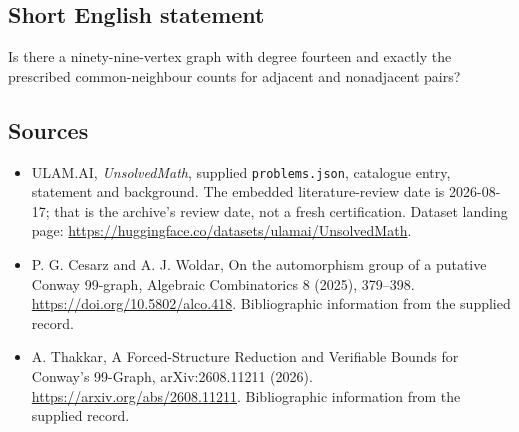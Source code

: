 \documentclass[11pt,a4paper]{article}
\begin{document}
\subsection{Short English statement}

Is there a ninety-nine-vertex graph with degree fourteen and exactly the prescribed common-neighbour counts for adjacent and nonadjacent pairs?

\subsection{Sources}

{\small

\begin{itemize}

\item[\hypertarget{source:statement:1}{S1}] ULAM.AI, \emph{UnsolvedMath}, supplied \texttt{problems.json}, catalogue entry, statement and background. The embedded literature-review date is 2026-08-17; that is the archive’s review date, not a fresh certification. Dataset landing page: \url{https://huggingface.co/datasets/ulamai/UnsolvedMath}.

\item[\hypertarget{source:statement:2}{S2}] P. G. Cesarz and A. J. Woldar, On the automorphism group of a putative Conway 99-graph, Algebraic Combinatorics 8 (2025), 379–398. \url{https://doi.org/10.5802/alco.418}. Bibliographic information from the supplied record.

\item[\hypertarget{source:statement:3}{S3}] A. Thakkar, A Forced-Structure Reduction and Verifiable Bounds for Conway's 99-Graph, arXiv:2608.11211 (2026). \url{https://arxiv.org/abs/2608.11211}. Bibliographic information from the supplied record.

\end{itemize}

}

\label{end:statement}
\end{document}
